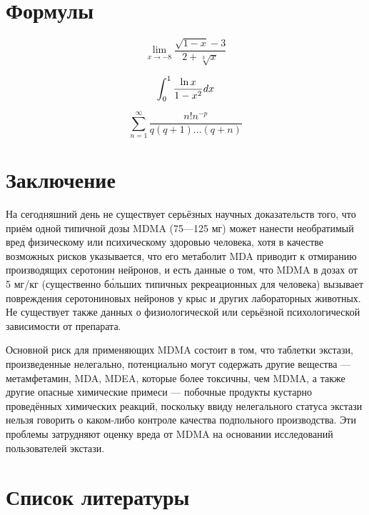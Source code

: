 \documentclass[a4paper,14pt,russian]{report}
\begin{document}
\section{Формулы}

\begin{equation*}
  \lim_{x \rightarrow -8}\frac{\sqrt{1-x}-3}{2+\sqrt[3]{x}}
\end{equation*}

\begin{equation*}
  \int_{0}^{1}\frac{\ln{x}}{1-x^{2}}d\\x
\end{equation*}

\begin{equation*}
  \sum_{n=1}^\infty\frac{n!n^{-p}}{q(q+1)...(q+n)}
\end{equation*}

\section{Заключение}

На сегодняшний день не существует серьёзных научных доказательств того, что приём одной типичной дозы MDMA (75—125 мг) может нанести необратимый вред физическому или психическому здоровью человека, хотя в качестве возможных рисков указывается, что его метаболит MDA приводит к отмиранию производящих серотонин нейронов, и есть данные о том, что MDMA в дозах от 5 мг/кг (существенно бо́льших типичных рекреационных для человека) вызывает повреждения серотониновых нейронов у крыс и других лабораторных животных. Не существует также данных о физиологической или серьёзной психологической зависимости от препарата.

Основной риск для применяющих MDMA состоит в том, что таблетки экстази, произведенные нелегально, потенциально могут содержать другие вещества — метамфетамин, MDA, MDEA, которые более токсичны, чем MDMA, а также другие опасные химические примеси — побочные продукты кустарно проведённых химических реакций, поскольку ввиду нелегального статуса экстази нельзя говорить о каком-либо контроле качества подпольного производства. Эти проблемы затрудняют оценку вреда от MDMA на основании исследований пользователей экстази.

\section{Список литературы}
\end{document}
